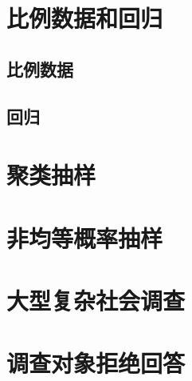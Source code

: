 \documentclass[fontset=fandol,zihao=false,scheme=chinese,heading=true,UTF8]{ctexbook}
\begin{document}
\hypertarget{section-4}{%
\chapter{比例数据和回归}\label{section-4}}

\hypertarget{section-5}{%
\section{比例数据}\label{section-5}}

\hypertarget{section-6}{%
\section{回归}\label{section-6}}

\hypertarget{section-7}{%
\chapter{聚类抽样}\label{section-7}}

\hypertarget{section-8}{%
\chapter{非均等概率抽样}\label{section-8}}

\hypertarget{section-9}{%
\chapter{大型复杂社会调查}\label{section-9}}

\hypertarget{section-10}{%
\chapter{调查对象拒绝回答}\label{section-10}}




\backmatter
\printindex
\end{document}
